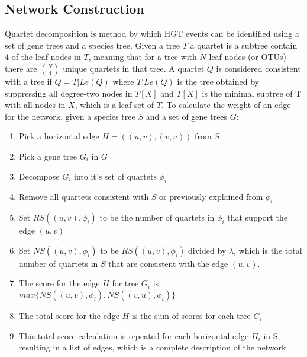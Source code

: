 \documentclass[12pt,letter]{article}
\begin{document}
\subsection{Network Construction}
Quartet decomposition is method by which HGT events can be identified using a set of gene trees and a species tree.
Given a tree $T$ a quartet is a subtree contain 4 of the leaf nodes in $T$, meaning that for a tree with $N$ leaf nodes (or OTUs) there are $\binom{N}{4}$ unique quartets in that tree.
A quartet $Q$ is considered consistent with a tree if $Q = T|Le(Q)$ where $T|Le(Q)$ is the tree obtained by suppressing all degree-two nodes in $T[X]$ and $T[X]$ is the minimal subtree of T with all nodes in $X$, which is a leaf set of $T$.
To calculate the weight of an edge for the network, given a species tree $S$ and a set of gene trees $G$:
\begin{enumerate}
    \item Pick a horizontal edge $H = ((u,v),(v,u))$ from $S$
    \item Pick a gene tree $G_i$ in $G$
    \item Decompose $G_i$ into it's set of quartets $\phi_i$
    \item Remove all quartets consistent with $S$ or previously explained from $\phi_i$
    \item Set $RS((u,v),\phi_i)$ to be the number of quartets in $\phi_i$ that support the edge $(u,v)$
    \item Set $NS((u,v),\phi_i)$ to be $RS((u,v),\phi_i)$ divided by $\lambda$, which is the total number of quartets in $S$ that are consistent with the edge $(u,v)$.
    \item The score for the edge $H$ for tree $G_i$ is $max\{NS((u,v),\phi_i),NS((v,u),\phi_i)\}$
    \item The total score for the edge $H$ is the sum of scores for each tree $G_i$
    \item This total score calculation is repeated for each horizontal edge $H_i$ in S, resulting in a list of edges, which is a complete description of the network.
\end{enumerate}
\end{document}
